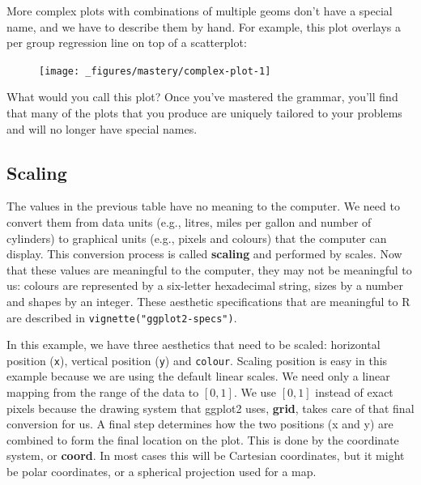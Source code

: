 More complex plots with combinations of multiple geoms don't have a
special name, and we have to describe them by hand. For example, this
plot overlays a per group regression line on top of a scatterplot:

\begin{Shaded}
\begin{Highlighting}[]
 \StringTok{ }
\StringTok{  }\NormalTok{() +}\StringTok{ }
\StringTok{  }\NormalTok{(} \NormalTok{)}
\end{Highlighting}
\end{Shaded}

\begin{figure}[H]
  \centering
  \texttt{[image: \_figures/mastery/complex-plot-1]}
\end{figure}

What would you call this plot? Once you've mastered the grammar, you'll
find that many of the plots that you produce are uniquely tailored to
your problems and will no longer have special names. 

\subsection{Scaling}

The values in the previous table have no meaning to the computer. We
need to convert them from data units (e.g., litres, miles per gallon and
number of cylinders) to graphical units (e.g., pixels and colours) that
the computer can display. This conversion process is called
\textbf{scaling} and performed by scales. Now that these values are
meaningful to the computer, they may not be meaningful to us: colours
are represented by a six-letter hexadecimal string, sizes by a number
and shapes by an integer. These aesthetic specifications that are
meaningful to R are described in \texttt{vignette("ggplot2-specs")}.

In this example, we have three aesthetics that need to be scaled:
horizontal position (\texttt{x}), vertical position (\texttt{y}) and
\texttt{colour}. Scaling position is easy in this example because we are
using the default linear scales. We need only a linear mapping from the
range of the data to \([0, 1]\). We use \([0, 1]\) instead of exact
pixels because the drawing system that ggplot2 uses, \textbf{grid},
takes care of that final conversion for us. A final step determines how
the two positions (x and y) are combined to form the final location on
the plot. This is done by the coordinate system, or \textbf{coord}. In
most cases this will be Cartesian coordinates, but it might be polar
coordinates, or a spherical projection used for a map.

